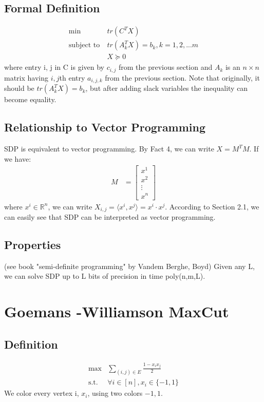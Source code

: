 \documentclass[11pt]{article}
\newcommand{\R}{\mathbb R}
\newcommand{\<}{\langle}
\renewcommand{\>}{\rangle}
\theoremstyle{definition}
\numberwithin{problem}{section}
\begin{document}
\subsection{Formal Definition}
\begin{align*}
\text{min}\  &tr(C^TX)\\
\text{subject to}\  &tr(A_k^TX) = b_k, k = 1, 2, ... m\\
& X \succeq 0
\end{align*}
where entry i, j in C is given by $c_{i,j}$ from the previous section and $A_k$ is an $n \times n$ matrix having $i, j$th entry $a_{i,j,k}$ from the previous section. Note that originally, it should be $tr(A_k^TX) = b_k$, but after adding slack variables the inequality can become equality.

\subsection{Relationship to Vector Programming}
SDP is equivalent to vector programming. By Fact 4, we can write $X = M^TM$. If we have:  
   \begin{align}
    M &= \begin{bmatrix}
           x^1 \\
           x^2 \\
           \vdots \\
           x^n
         \end{bmatrix}
  \end{align}
  where $x^i \in \R^n$, we can write  $X_{i,j} = \<x^i, x^j\> = x^i \cdot x^j$. According to Section 2.1, we can easily see that SDP can be interpreted as vector programming.

\subsection{Properties}
(see book "semi-definite programming" by Vandem Berghe, Boyd) Given any L, we can solve SDP up to L bits of precision in time poly(n,m,L).



\section{Goemans -Williamson MaxCut}
\subsection{Definition}
\begin{align*}
\text{max} &\sum_{(i,j) \in E} \frac{1 - x_ix_j}{2} \\
\text{s.t.}\ &\forall i \in [n], x_i \in \{-1, 1\}
\end{align*}
We color every vertex i, $x_i$, using two colors $-1, 1$.
\end{document}

